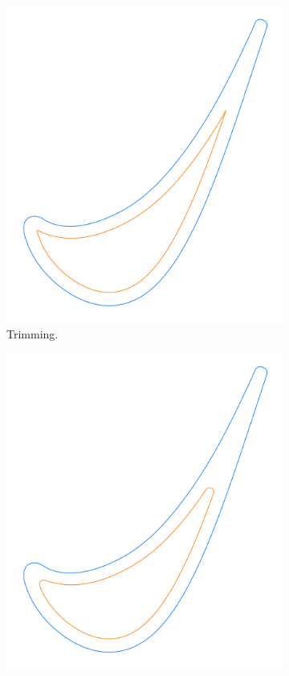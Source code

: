 \documentclass[a4paper, 11pt]{report}
\theoremstyle{definition}
\begin{document}
\begin{figure}[H]
\begin{subfigure}{.32\textwidth}
			\includegraphics[width=\textwidth]{../tec/shrinking/62.png}
			\caption{Trimming.}
		\end{subfigure}
		\begin{subfigure}{.32\textwidth}
			\includegraphics[width=\textwidth]{../tec/shrinking/63.png}

\end{subfigure}
\end{figure}
\end{document}
